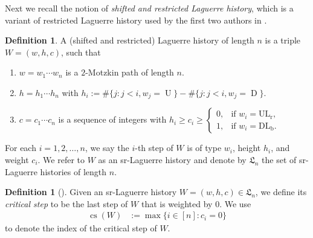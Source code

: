 \documentclass[12pt,reqno]{amsart}
\numberwithin{equation}{section}
\theoremstyle{plain}
\theoremstyle{definition}
\newtheorem{Def}[theorem]{Definition}
\def\rU{\operatorname{U}}
\def\rD{\operatorname{D}}
\def\ULr{\operatorname{UL_r}}
\def\DLb{\operatorname{DL_b}}
\def\LH{\mathfrak{L}}
\def\cs{\operatorname{cs}}
\begin{document}
Next we recall the notion of \emph{shifted and restricted Laguerre history}, which is a variant of restricted Laguerre history used by the first two authors in \cite[Definition 2.1]{CF23}.

\begin{Def}\label{def:LH}
A (shifted and restricted) Laguerre history of length $n$ is a triple $W=(w,h,c)$, such that
\begin{enumerate}
  \item $w=w_1\cdots w_n$ is a $2$-Motzkin path of length $n$.
  \item $h=h_1\cdots h_n$ with $h_i:=\#\{j : j<i, w_j=\rU\}-\#\{j : j<i, w_j=\rD\}$.
  \item $c=c_1\cdots c_n$ is a sequence of integers with $h_i\ge c_i\ge \begin{cases}
  0, & \text{if } w_i=\ULr,\\
  1, & \text{if } w_i=\DLb.
  \end{cases}$
\end{enumerate}
For each $i=1,2,\ldots,n$, we say the $i$-th step of $W$ is of type $w_i$, height $h_i$, and weight $c_i$. We refer to $W$ as an sr-Laguerre history and denote by $\LH_n$ the set of sr-Laguerre histories of length $n$.
\end{Def}

\begin{Def}[{\cite[Definition 3.1]{CF23}}]
Given an sr-Laguerre history $W=(w,h,c)\in\LH_n$, we define its {\it critical step} to be the last step of $W$ that is weighted by $0$. We use
\begin{align}
\cs(W)& :=\max\{i\in[n] : c_i=0\}
\end{align}
to denote the index of the critical step of $W$.
\end{Def}
\end{document}
